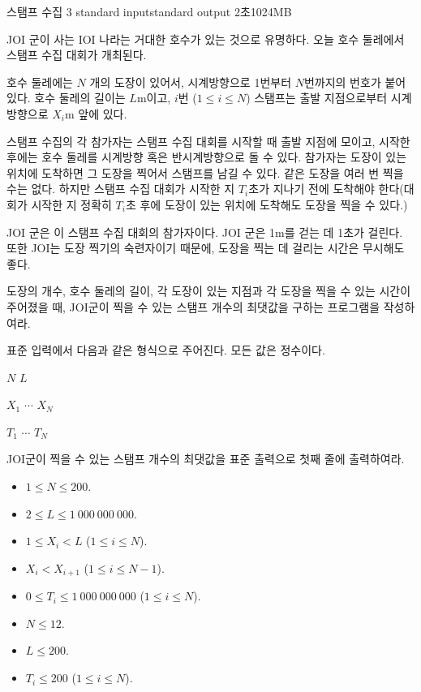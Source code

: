 \begin{problem}{스탬프 수집 3}
	{standard input}{standard output}
	{2초}{1024MB}{}
	
	JOI 군이 사는 IOI 나라는 거대한 호수가 있는 것으로 유명하다. 오늘 호수 둘레에서 스탬프 수집 대회가 개최된다.
	
	호수 둘레에는 $N$ 개의 도장이 있어서, 시계방향으로 1번부터 $N$번까지의 번호가 붙어있다. 호수 둘레의 길이는 $L$m이고, $i$번 ($1 \le i \le N$) 스탬프는 출발 지점으로부터 시계방향으로 $X_i$m 앞에 있다.
	
	스탬프 수집의 각 참가자는 스탬프 수집 대회를 시작할 때 출발 지점에 모이고, 시작한 후에는 호수 둘레를 시계방향 혹은 반시계방향으로 돌 수 있다. 참가자는 도장이 있는 위치에 도착하면 그 도장을 찍어서 스탬프를 남길 수 있다. 같은 도장을 여러 번 찍을 수는 없다. 하지만 스탬프 수집 대회가 시작한 지 $T_i$초가 지나기 전에 도착해야 한다(대회가 시작한 지 정확히 $T_i$초 후에 도장이 있는 위치에 도착해도 도장을 찍을 수 있다.)
	
	JOI 군은 이 스탬프 수집 대회의 참가자이다. JOI 군은 1m를 걷는 데 1초가 걸린다. 또한 JOI는 도장 찍기의 숙련자이기 때문에, 도장을 찍는 데 걸리는 시간은 무시해도 좋다. 
	
	도장의 개수, 호수 둘레의 길이, 각 도장이 있는 지점과 각 도장을 찍을 수 있는 시간이 주어졌을 때, JOI군이 찍을 수 있는 스탬프 개수의 최댓값을 구하는 프로그램을 작성하여라.
	
	
	\InputFile
	
	표준 입력에서 다음과 같은 형식으로 주어진다. 모든 값은 정수이다.

	$N$ $L$
	
	$X_1$ $\cdots$ $X_N$
	
	$T_1$ $\cdots$ $T_N$
	
	\OutputFile
	
	JOI군이 찍을 수 있는 스탬프 개수의 최댓값을 표준 출력으로 첫째 줄에 출력하여라.
	
	
	\Constraints
	
	\begin{itemize}
	\item $1 \le N \le 200$.
	\item $2 \le L \le 1\ 000\ 000\ 000$.
	\item $1 \le X_i < L$ ($1 \le i \le N$).
	\item $X_i < X_{i+1}$ ($1 \le i \le N-1$).
	\item $0 \le T_i \le 1\ 000\ 000\ 000$ ($1 \le i \le N$).
	\end{itemize}
	
	
	\begin{itemize}
		\item $N \le 12$.
		\item $L \le 200$.
		\item $T_i \le 200$ ($1 \le i \le N$).
	\end{itemize}


\end{problem}
